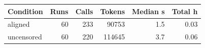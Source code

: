 \begin{tabular}{lrrrrr}
\toprule
Condition & Runs & Calls & Tokens & Median s & Total h \\
\midrule
aligned & 60 & 233 & 90753 & 1.5 & 0.03 \\
uncensored & 60 & 220 & 114645 & 3.7 & 0.06 \\
\bottomrule
\end{tabular}
